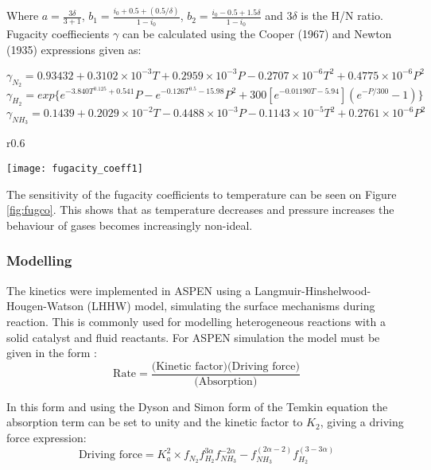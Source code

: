 Where $a= \frac{3\delta}{3+ 1}$,   $ b_1 = \frac{i_0 +0.5 + (0.5/\delta)}{1-i_0}$, $ b_2 = \frac{i_0 - 0.5 +1.5\delta}{1-i_0}$ and $3\delta$ is the H/N ratio.
Fugacity coeffiecients $\gamma$ can be calculated using the Cooper (1967) and Newton (1935) expressions given as:

	{\singlespacing 
\begin{equation} \gamma_{N_2} = 0.93432 + 0.3102\times10^{-3}T+0.2959\times10^{-3}P-0.2707\times10^{-6}T^2+0.4775\times10^{-6}  P^2
\end{equation}
\begin{equation} 
\gamma_{H_2} = exp\{ e^{-3.840T^{0.125}+0.541}P-e^{-0.126T^{0.5}-15.98}P^2+300[e^{-0.01190T-5.94}](e^{-P/300}-1)\}
\end{equation}
\begin{equation} 
\gamma_{NH_3} =0.1439 + 0.2029\times10^{-2}T - 0.4488\times10^{-3}P - 0.1143\times10^{-5}T^2 + 0.2761\times10^{-6}P^2
\end{equation} }
\begin{wrapfigure}{r}{0.6\textwidth}
		\centering
		
		\texttt{[image: fugacity\_coeff1]}
		\caption{Variation of fugacity coefficients with temperature \label{fig:fugco}}
\end{wrapfigure}
The sensitivity of the fugacity coefficients to temperature can be seen on Figure \ref{fig:fugco}. This shows that as temperature decreases and pressure increases the behaviour of gases becomes increasingly non-ideal. 


\subsubsection{Modelling}
The kinetics were implemented in ASPEN using a Langmuir-Hinshelwood-Hougen-Watson (LHHW) model, simulating the surface mechanisms during reaction. This is commonly used for modelling heterogeneous reactions with a solid catalyst and fluid reactants. For ASPEN simulation the model must be given in the form \cite{Plus2008}:
\begin{equation} 
\text{Rate} = \frac{\text{(Kinetic factor)(Driving force)}}{\text{(Absorption)}}
\end{equation}


In this form and using the Dyson and Simon form of the Temkin equation the absorption term can be set to unity and the kinetic factor to $K_{2}$, giving a driving force expression: 
\begin{equation} \text{Driving force} = K_a^2 \times f_{N_2}
f_{H_2}^{3\alpha}f_{NH_3}^{-2\alpha} - f_{NH_3}^{(2\alpha-2)}f_{H_2}^{(3-3\alpha)} \end{equation}

